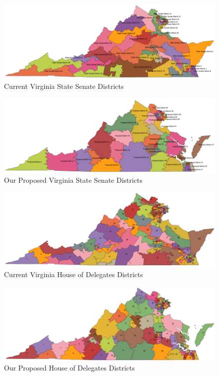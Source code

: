 \documentclass[11pt]{article}
\begin{document}
\begin{figure}[H]
	\centering
	\includegraphics[width=\textwidth]{FinalMap3}
	\caption{Current Virginia State Senate Districts}
	\label{fig:fm3}
\end{figure}

\begin{figure}[H]
	\centering
	\includegraphics[width=\textwidth]{FinalMap4}
	\caption{Our Proposed Virginia State Senate Districts}
	\label{fig:fm4}
\end{figure}

\begin{figure}[H]
	\centering
	\includegraphics[width=\textwidth]{FinalMap5}
	\caption{Current Virginia House of Delegates Districts}
	\label{fig:fm5}
\end{figure}

\begin{figure}[H]
	\centering
	\includegraphics[width=\textwidth]{FinalMap6}
	\caption{Our Proposed House of Delegates Districts}
	\label{fig:fm6}
\end{figure}
\end{document}
